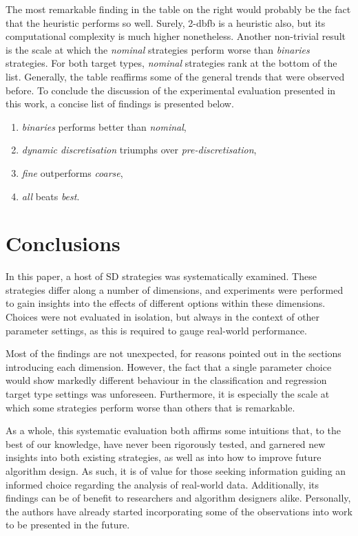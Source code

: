 \documentclass[smallextended]{svjour3}
\newcommand{\parameter}{\emph}
\newcommand{\dyndis}{\parameter{dynamic discretisation}}
\newcommand{\predis}{\parameter{pre-discretisation}}
\newcommand{\binaries}{\parameter{binaries}}
\newcommand{\nominal}{\parameter{nominal}}
\newcommand{\fine}{\parameter{fine}}
\newcommand{\coarse}{\parameter{coarse}}
\newcommand{\all}{\parameter{all}}
\newcommand{\best}{\parameter{best}}
\newcommand{\dbfb}[1]{2-dbfb}
\newcommand{\dbca}[1]{\ifthenelse{\equal{#1}{0}}{3-dbca}{3-dbca\textsuperscript{#1}}}
\newcommand{\sd}{SD}
\begin{document}
The most remarkable finding in the table on the right would probably be the fact that the heuristic \dbca{0} performs so well.
Surely, \dbfb{0} is a heuristic also, but its computational complexity is much higher nonetheless.
Another non-trivial result is the scale at which the \nominal{} strategies perform worse than \binaries{} strategies.
For both target types, \nominal{} strategies rank at the bottom of the list.
Generally, the table reaffirms some of the general trends that were observed before.
To conclude the discussion of the experimental evaluation presented in this work, a concise list of findings is presented below.

\begin{enumerate}
\item \binaries{} performs better than \nominal{},
\item \dyndis{} triumphs over \predis{},
\item \fine{} outperforms \coarse{},
\item \all{} beats \best{}.
\end{enumerate}





\section{Conclusions}
\label{section:conclusions}

In this paper, a host of \sd{} strategies was systematically examined.
These strategies differ along a number of dimensions, and experiments were performed to gain insights into the effects of different options within these dimensions.
Choices were not evaluated in isolation, but always in the context of other parameter settings, as this is required to gauge real-world performance.

Most of the findings are not unexpected, for reasons pointed out in the sections introducing each dimension.
However, the fact that a single parameter choice would show markedly different behaviour in the classification and regression target type settings was unforeseen.
Furthermore, it is especially the scale at which some strategies perform worse than others that is remarkable.

As a whole, this systematic evaluation both affirms some intuitions that, to the best of our knowledge, have never been rigorously tested, and garnered new insights into both existing strategies, as well as into how to improve future algorithm design.
As such, it is of value for those seeking information guiding an informed choice regarding the analysis of real-world data.
Additionally, its findings can be of benefit to researchers and algorithm designers alike.
Personally, the authors have already started incorporating some of the observations into work to be presented in the future.
\end{document}
